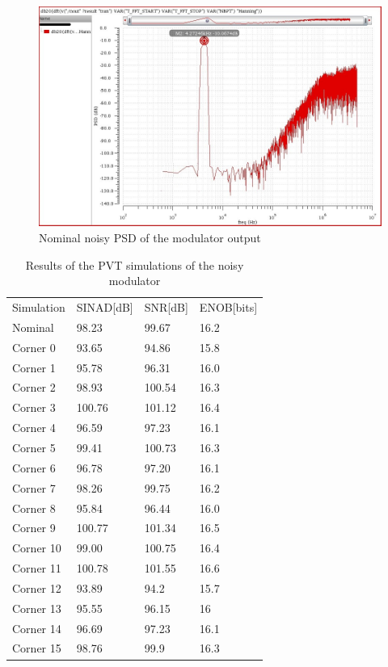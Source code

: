 \begin{figure}[H]
\centering
\includegraphics[width=\textwidth]{images/psd_noise_out.jpg}
\caption{Nominal noisy PSD of the modulator output }
\label{psd_noise_out}
\end{figure}

\begin{table}[H]
\centering

\caption{Results of the PVT simulations of the noisy modulator}
\label{modul_noisy_out}
\begin{tabular}{l|l|l|l}
\hline
\multirow{1}{*}{Simulation} & \multicolumn{1}{c|}{SINAD[dB]} & \multicolumn{1}{c|}{SNR[dB]} & \multicolumn{1}{c}{ENOB[bits]} \\\cline{1-3}
                       
            Nominal      &98.23 & 99.67 & 16.2\\
            Corner 0      &93.65 & 94.86 & 15.8\\
            Corner 1      &95.78 & 96.31 & 16.0\\
            Corner 2      &98.93 & 100.54 & 16.3\\
            Corner 3     &100.76 & 101.12 & 16.4\\
            Corner 4     &96.59 & 97.23 & 16.1\\
            Corner 5      &99.41 & 100.73 & 16.3\\
            Corner 6      &96.78 & 97.20 & 16.1\\
            Corner 7      &98.26 & 99.75 & 16.2\\
            Corner 8      &95.84 & 96.44 & 16.0\\
            Corner 9      &100.77 & 101.34 & 16.5\\
            Corner 10      &99.00 & 100.75 & 16.4\\
            Corner 11      &100.78 & 101.55 & 16.6\\
            Corner 12      &93.89 & 94.2 & 15.7\\
            Corner 13      &95.55 & 96.15 & 16\\
            Corner 14      &96.69 & 97.23 & 16.1\\
            Corner 15      &98.76 & 99.9 & 16.3\\
            
\hline            
\end{tabular}
\end{table}


